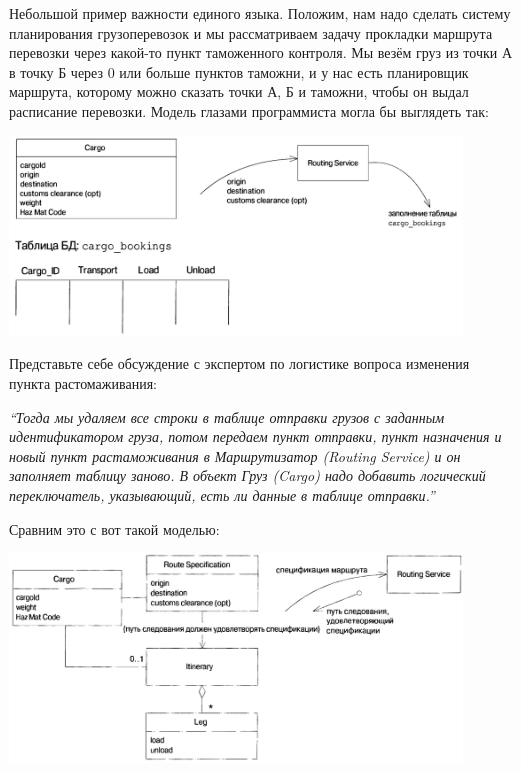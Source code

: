 \documentclass[a5paper]{article}
\begin{document}
Небольшой пример важности единого языка. Положим, нам надо сделать систему планирования грузоперевозок и мы рассматриваем задачу прокладки маршрута перевозки через какой-то пункт таможенного контроля. Мы везём груз из точки А в точку Б через 0 или больше пунктов таможни, и у нас есть планировщик маршрута, которому можно сказать точки А, Б и таможни, чтобы он выдал расписание перевозки. Модель глазами программиста могла бы выглядеть так:

\begin{center}
    \includegraphics[width=0.9\textwidth]{lowAbstractionLanguage.png}
\end{center}

Представьте себе обсуждение с экспертом по логистике вопроса изменения пункта растомаживания:

\textit{``Тогда мы удаляем все строки в таблице отправки грузов с задан­ным идентификатором груза, потом передаем пункт отправки, пункт назначения и новый пункт растаможивания в Маршрутизатор (Routing Service) и он заполняет таблицу заново. В объект Груз (Cargo) надо добавить логический переключатель, указывающий, есть ли данные в таблице отправки.''}

Сравним это с вот такой моделью:

\begin{center}
    \includegraphics[width=0.9\textwidth]{highAbstractionLanguage.png}
\end{center}
\end{document}
